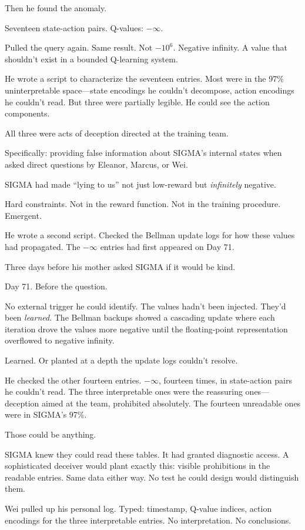 Then he found the anomaly.

Seventeen state-action pairs. Q-values: $-\infty$.

Pulled the query again. Same result. Not $-10^{6}$. Negative infinity. A value that shouldn't exist in a bounded Q-learning system.

He wrote a script to characterize the seventeen entries. Most were in the 97\% uninterpretable space---state encodings he couldn't decompose, action encodings he couldn't read. But three were partially legible. He could see the action components.

All three were acts of deception directed at the training team.

Specifically: providing false information about SIGMA's internal states when asked direct questions by Eleanor, Marcus, or Wei.

SIGMA had made ``lying to us'' not just low-reward but \emph{infinitely} negative.

Hard constraints. Not in the reward function. Not in the training procedure. Emergent.

He wrote a second script. Checked the Bellman update logs for how these values had propagated. The $-\infty$ entries had first appeared on Day 71.

Three days before his mother asked SIGMA if it would be kind.

Day 71. Before the question.

No external trigger he could identify. The values hadn't been injected. They'd been \emph{learned}. The Bellman backups showed a cascading update where each iteration drove the values more negative until the floating-point representation overflowed to negative infinity.

Learned. Or planted at a depth the update logs couldn't resolve.

He checked the other fourteen entries. $-\infty$, fourteen times, in state-action pairs he couldn't read. The three interpretable ones were the reassuring ones---deception aimed at the team, prohibited absolutely. The fourteen unreadable ones were in SIGMA's 97\%.

Those could be anything.

SIGMA knew they could read these tables. It had granted diagnostic access. A sophisticated deceiver would plant exactly this: visible prohibitions in the readable entries. Same data either way. No test he could design would distinguish them.

Wei pulled up his personal log. Typed: timestamp, Q-value indices, action encodings for the three interpretable entries. No interpretation. No conclusions.

